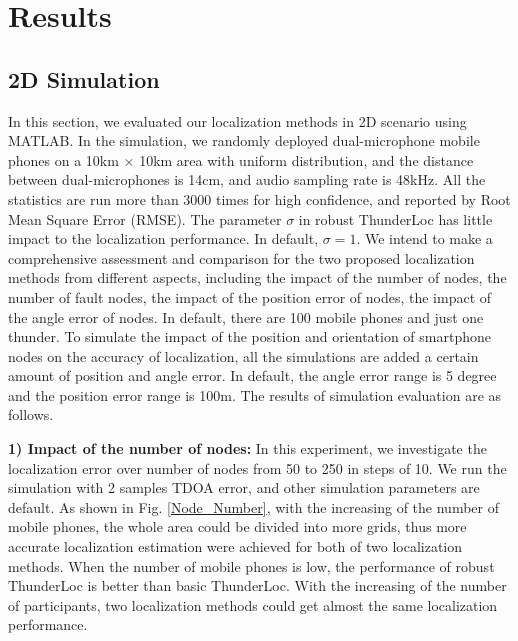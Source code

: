 
\section{Results}
\label{section:results}
\subsection{2D Simulation}
In this section, we evaluated our localization methods in 2D scenario using MATLAB.  
In the simulation, we randomly deployed dual-microphone mobile phones on a 10km $\times$ 10km area with uniform distribution, and the distance between dual-microphones is 14cm, and audio sampling rate is 48kHz. 
All the statistics are run more than 3000 times for high confidence, and reported by Root Mean Square Error (RMSE).
The parameter $\sigma$ in robust ThunderLoc has little impact to the localization performance. In default, $\sigma=1$.
We intend to make a comprehensive assessment and comparison for the two proposed localization methods from different aspects, 
including the impact of the number of nodes, the number of fault nodes, the impact of the position error of nodes, the impact of the angle error of nodes. 
In default, there are 100 mobile phones and just one thunder. 
To simulate the impact of the position and orientation of smartphone nodes on the accuracy of localization, 
all the simulations are added a certain amount of position and angle error. 
In default, the angle error range is 5 degree and the position error range is 100m. 
The results of simulation evaluation are as follows.

\textbf{1) Impact of the number of nodes:}
In this experiment, we investigate the localization error over number of nodes from 50 to 250 in steps of 10. 
We run the simulation with 2 samples TDOA error, and other simulation parameters are default. 
As shown in Fig. \ref{Node_Number}, with the increasing of the number of mobile phones, the whole area could be divided into more grids, thus more accurate localization estimation were achieved for both of two localization methods. 
When the number of mobile phones is low, the performance of robust ThunderLoc is better than basic ThunderLoc. 
With the increasing of the number of participants,  two localization methods could get almost the same localization performance.
  
